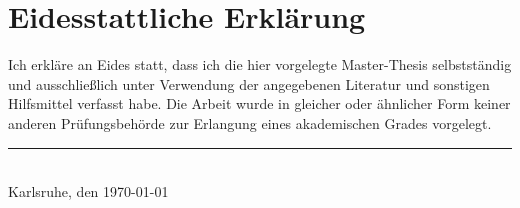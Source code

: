 \documentclass[
english,
oneside,
paper=A4,
fontsize=11pt,
BCOR=2mm,				%
DIV=default,			%
open=any,				%
listof=toc, 
bibliography=totoc,
parskip=half			%
]{Thesis} %
\title{\ttitle} %
\begin{document}
	
	\frontmatter %
	
	
	\fancyhead{} %
	\rhead{\thepage} %
	\lhead{} %
	
	\pagestyle{fancy} %
	
	\newcommand{\HRule}{\rule{\linewidth}{0.5mm}} %
	
	\newcommand{\brparagraph}[1]{\paragraph{#1}\mbox{}\\}
	
	\newcommand{\source}[1]{\caption*{Source: {#1}} }
	
	\hypersetup{pdfsubject=\subjectname}
	\hypersetup{pdfauthor=\authornames}
	\hypersetup{pdfkeywords=\keywordnames}
	
	
	
	
	\newpage
	
	\section*{Eidesstattliche Erklärung}
	
	Ich erkläre an Eides statt, dass ich die hier vorgelegte Master-Thesis selbstständig und
	ausschließlich unter Verwendung der angegebenen Literatur und sonstigen Hilfsmittel verfasst habe.
	Die Arbeit wurde in gleicher oder ähnlicher Form keiner anderen Prüfungsbehörde zur Erlangung
	eines akademischen Grades vorgelegt.
	
	\vspace{1.3cm}
	
	\noindent\rule[-0.1cm]{6cm}{0.5pt}\\
	Karlsruhe, den \today
	\newpage
\end{document}
